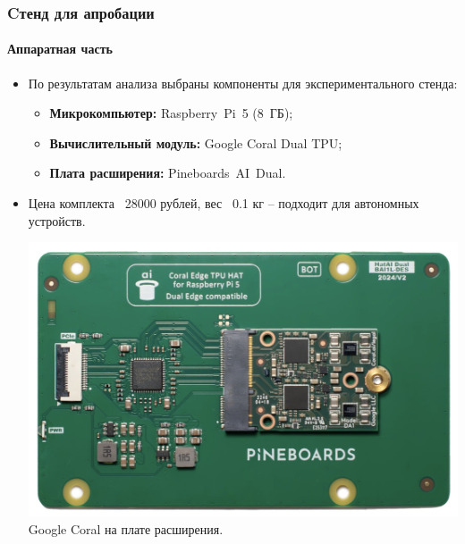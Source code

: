 \documentclass{beamer} %
\begin{document}


\begin{frame}
  \frametitle{Cтенд для апробации}
  \framesubtitle{Аппаратная часть}
  \begin{itemize}
      \item По результатам анализа выбраны компоненты для экспериментального стенда:
      \begin{itemize}
          \item \textbf{Микрокомпьютер:} Raspberry Pi 5 (8 ГБ);
          \item \textbf{Вычислительный модуль:} Google Coral Dual TPU;
          \item \textbf{Плата расширения:} Pineboards AI Dual.
      \end{itemize}
      \item Цена комплекта ~28000 рублей, вес ~0.1 кг -- подходит для автономных устройств.
      
      \centering
  \includegraphics[width=0.5\linewidth]{images/presentation/tpu.png}\\
  \small Google Coral на плате расширения.
  \end{itemize}
\end{frame}
\end{document}
